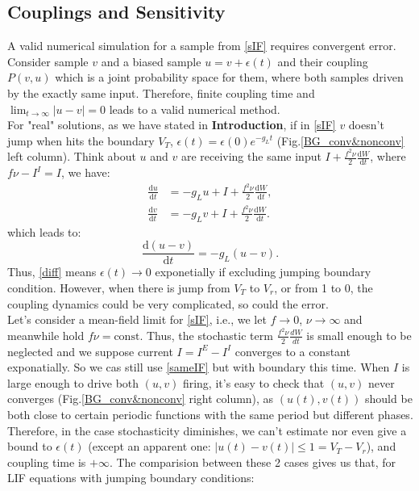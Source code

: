 \documentclass[10pt]{article}
\begin{document}
\begin{multicols}{2}
\subsection{Couplings and Sensitivity}
A valid numerical simulation for a sample from \ref{sIF} requires convergent error. Consider sample $v$ and a biased sample $u=v+\epsilon(t)$ and their coupling $P(v,u)$ which is a joint probability space for them, where both samples driven by the exactly same input. Therefore, finite coupling time and $\lim_{t\to\infty}|u-v|=0$ leads to a valid numerical method. \\
\indent
For "real" solutions, as we have stated in {\bf{Introduction}}, if in \ref{sIF} $v$ doesn't jump when hits the boundary $V_T$, $\epsilon(t) = \epsilon(0)e^{-g_Lt}$ (Fig.\ref{BG_conv&nonconv} left column). Think about $u$ and $v$ are receiving the same input $I+\frac{f^2\nu}{2}\frac{\mbox{d}W}{\mbox{d}t}$, where$f\nu-I^I=I$, we have:
\begin{subequations}
\begin{align}
\frac{\mbox{d}u}{\mbox{d}t} & =  - g_Lu+I+\frac{f^2\nu}{2}\frac{\mbox{d}W}{\mbox{d}t}, \label{uIF}\\
\frac{\mbox{d}v}{\mbox{d}t} &=  - g_Lv+I+\frac{f^2\nu}{2}\frac{\mbox{d}W}{\mbox{d}t}.  \label{vIF}
\end{align}
\end{subequations}
which leads to:
\begin{equation}
    \frac{\mbox{d}(u-v)}{\mbox{d}t} =  - g_L(u-v). \label{sameIF}
\end{equation}
Thus, \ref{diff} means $\epsilon(t)\to0$ exponetially if excluding jumping boundary condition. However, when there is jump from $V_T$ to $V_{r}$, or from 1 to 0, the coupling dynamics could be very complicated, so could the error. \\
\indent
Let's consider a mean-field limit for \ref{sIF}, i.e., we let $f\rightarrow0$, $\nu\rightarrow\infty$ and meanwhile hold $f\nu=\mbox{const}$. Thus, the stochastic term $\frac{f^2\nu}{2}\frac{dW}{dt}$ is small enough to be neglected and we suppose current $I=I^{E}-I^I$ converges to a constant exponatially. So we cas still use \ref{sameIF} but with boundary this time. When $I$ is large enough to drive both $(u,v)$ firing, it's easy to check that $(u,v)$ never converges (Fig.\ref{BG_conv&nonconv} right column), as $(u(t),v(t))$ should be both close to certain periodic functions with the same period but different phases. Therefore, in the case stochasticity diminishes, we can't estimate nor even give a bound to $\epsilon(t)$ (except an apparent one: $|u(t)-v(t)|\leq 1=V_{T}-V_r$), and coupling time is $+\infty$. The comparision between these 2 cases gives us that, for LIF equations with jumping boundary conditions:

\end{multicols}
\end{document}
